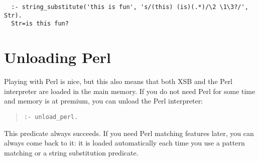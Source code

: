 \begin{verbatim}
  :- string_substitute('this is fun', 's/(this) (is)(.*)/\2 \1\3?/', Str).
  Str=is this fun?
\end{verbatim}

\section{Unloading Perl}
Playing with Perl is nice, but this also means that both XSB and the Perl
interpreter  are loaded in the main memory. If you do not need Perl
for some time and memory is at premium, you can unload the Perl
interpreter:
\begin{quote}
   {\tt :- unload\_perl. }
\end{quote}
This predicate always succeeds. If you need Perl matching features later,
you can always come back to it: it is loaded automatically each time you
use a pattern matching or a string substitution predicate.

